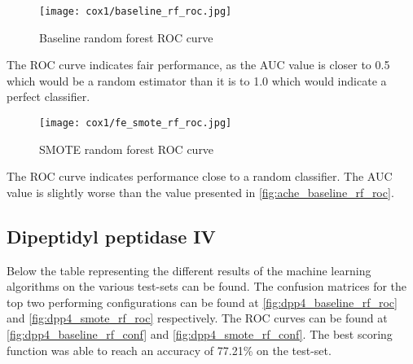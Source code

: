 \begin{figure}[H]
    \begin{center}
        \caption[]{Baseline random forest ROC curve}
        \label{fig:cox1_baseline_rf_roc}
        \texttt{[image: cox1/baseline\_rf\_roc.jpg]}
    \end{center}

\end{figure}
The ROC curve indicates fair performance, as the AUC value is closer to 0.5 which would be a random estimator than it is to 1.0 which would indicate a perfect classifier.

\begin{figure}[H]
    \begin{center}
        \caption[]{SMOTE random forest ROC curve}
        \label{fig:cox1_smote_rf_roc}
        \texttt{[image: cox1/fe\_smote\_rf\_roc.jpg]}
    \end{center}
\end{figure}
The ROC curve indicates performance close to a random classifier. The AUC value is slightly worse than the value presented in \ref*{fig:ache_baseline_rf_roc}.

\subsection{Dipeptidyl peptidase IV}
Below the table representing the different results of the machine learning algorithms on the various test-sets can be found.
The confusion matrices for the top two performing configurations can be found at \ref{fig:dpp4_baseline_rf_roc} and \ref{fig:dpp4_smote_rf_roc}
respectively. The ROC curves can be found at \ref{fig:dpp4_baseline_rf_conf} and \ref{fig:dpp4_smote_rf_conf}.
The best scoring function was able to reach an accuracy of 77.21\% on the test-set.

